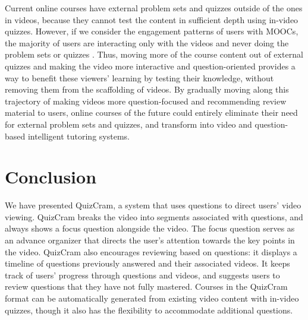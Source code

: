 \documentclass{chi-ext}
\begin{document}
Current online courses have external problem sets and quizzes outside of the ones in videos, because they cannot test the content in sufficient depth using in-video quizzes. However, if we consider the engagement patterns of users with MOOCs, the majority of users are interacting only with the videos and never doing the problem sets or quizzes \cite{anderson2014engaging}. Thus, moving more of the course content out of external quizzes and making the video more interactive and question-oriented provides a way to benefit these viewers' learning by testing their knowledge, without removing them from the scaffolding of videos. By gradually moving along this trajectory of making videos more question-focused and recommending review material to users, online courses of the future could entirely eliminate their need for external problem sets and quizzes, and transform into video and question-based intelligent tutoring systems.



\section{Conclusion}
We have presented QuizCram, a system that uses questions to direct users' video viewing. QuizCram breaks the video into segments associated with questions, and always shows a focus question alongside the video. The focus question serves as an advance organizer that directs the user's attention towards the key points in the video. QuizCram also encourages reviewing based on questions: it displays a timeline of questions previously answered and their associated videos. It keeps track of users' progress through questions and videos, and suggests users to review questions that they have not fully mastered. Courses in the QuizCram format can be automatically generated from existing video content with in-video quizzes, though it also has the flexibility to accommodate additional questions.
\end{document}
